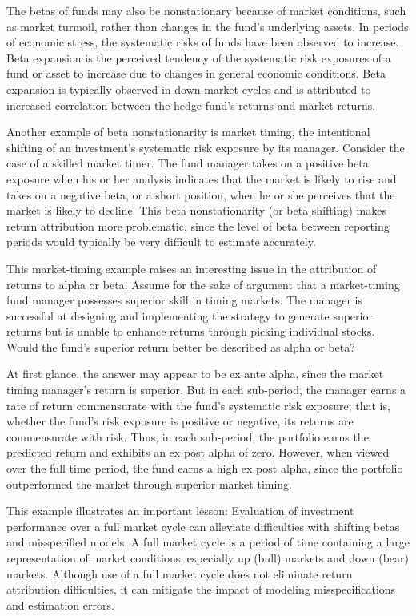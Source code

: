 \documentclass[11pt]{article}
\begin{document}
The betas of funds may also be nonstationary because of market conditions, such as market turmoil, rather than changes in the fund's underlying assets. In periods of economic stress, the systematic risks of funds have been observed to increase. Beta expansion is the perceived tendency of the systematic risk exposures of a fund or asset to increase due to changes in general economic conditions. Beta expansion is typically observed in down market cycles and is attributed to increased correlation between the hedge fund's returns and market returns.

Another example of beta nonstationarity is market timing, the intentional shifting of an investment's systematic risk exposure by its manager. Consider the case of a skilled market timer. The fund manager takes on a positive beta exposure when his or her analysis indicates that the market is likely to rise and takes on a negative beta, or a short position, when he or she perceives that the market is likely to decline. This beta nonstationarity (or beta shifting) makes return attribution more problematic, since the level of beta between reporting periods would typically be very difficult to estimate accurately.

This market-timing example raises an interesting issue in the attribution of returns to alpha or beta. Assume for the sake of argument that a market-timing fund manager possesses superior skill in timing markets. The manager is successful at designing and implementing the strategy to generate superior returns but is unable to enhance returns through picking individual stocks. Would the fund's superior return better be described as alpha or beta?

At first glance, the answer may appear to be ex ante alpha, since the market timing manager's return is superior. But in each sub-period, the manager earns a rate of return commensurate with the fund's systematic risk exposure; that is, whether the fund's risk exposure is positive or negative, its returns are commensurate with risk. Thus, in each sub-period, the portfolio earns the predicted return and exhibits an ex post alpha of zero. However, when viewed over the full time period, the fund earns a high ex post alpha, since the portfolio outperformed the market through superior market timing.

This example illustrates an important lesson: Evaluation of investment performance over a full market cycle can alleviate difficulties with shifting betas and misspecified models. A full market cycle is a period of time containing a large representation of market conditions, especially up (bull) markets and down (bear) markets. Although use of a full market cycle does not eliminate return attribution difficulties, it can mitigate the impact of modeling misspecifications and estimation errors.
\end{document}
